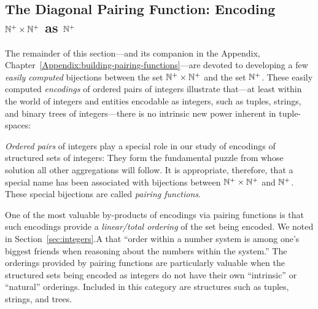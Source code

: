 \subsection{The Diagonal Pairing Function: Encoding $\mathbb{N}^+ \times \mathbb{N}^+$ as $\mathbb{N}^+$}
\label{sec:building-pairing-functions}
\label{sec:diag-pair-fn}


The remainder of this section---and its companion in the Appendix, Chapter~\ref{Appendix:building-pairing-functions}---are devoted to developing a few {\em easily computed} bijections between the set $\mathbb{N}^+ \times \mathbb{N}^+$ and the set $\mathbb{N}^+$.  These easily computed {\em encodings} of ordered pairs of integers illustrate that---at least within the world of integers and entities encodable as integers, such as tuples, strings, and binary trees of integers---there is no intrinsic new power inherent in tuple-spaces: 

\smallskip

{\em Ordered pairs} of integers play a special role in our study of encodings of structured sets of integers:  They form the fundamental puzzle from whose solution all other aggregations will follow.
It is appropriate, therefore, that a special name has been associated with bijections between $\mathbb{N}^+ \times \mathbb{N}^+$ and $\mathbb{N}^+$.  These special bijections are called {\it pairing functions}. 

\medskip


One of the most valuable by-products of encodings via pairing functions is that such encodings provide a {\em linear/total ordering} of the set being encoded.  We noted in Section~\ref{sec:integers}.A that ``order within a number system is among one's biggest friends when reasoning about the numbers within the system.''  The orderings provided by pairing functions are particularly valuable when the structured sets being encoded as integers do not have their own ``intrinsic'' or ``natural'' orderings.  Included in this category are structures such as tuples, strings, and trees.

\bigskip

\noindent {}
\bigskip

